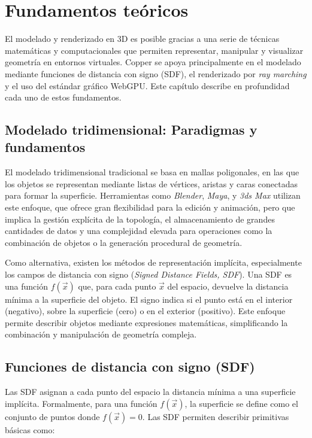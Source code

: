 \chapter{Fundamentos teóricos}

El modelado y renderizado en 3D es posible gracias a una serie de técnicas
matemáticas y computacionales que permiten representar, manipular y visualizar
geometría en entornos virtuales. Copper se apoya principalmente en el modelado
mediante funciones de distancia con signo (SDF), el renderizado por \textit{ray
    marching} y el uso del estándar gráfico WebGPU. Este capítulo describe en
profundidad cada uno de estos fundamentos.

\section{Modelado tridimensional: Paradigmas y fundamentos}

El modelado tridimensional tradicional se basa en mallas poligonales, en las
que los objetos se representan mediante listas de vértices, aristas y caras
conectadas para formar la superficie. Herramientas como \textit{Blender},
\textit{Maya}, y \textit{3ds Max} utilizan este enfoque, que ofrece gran
flexibilidad para la edición y animación, pero que implica la gestión explícita
de la topología, el almacenamiento de grandes cantidades de datos y una
complejidad elevada para operaciones como la combinación de objetos o la
generación procedural de
geometría.

Como alternativa, existen los métodos de representación implícita,
especialmente los campos de distancia con signo (\textit{Signed Distance
    Fields, SDF}). Una SDF es una función $f(\vec{x})$ que, para cada punto
$\vec{x}$ del espacio, devuelve la distancia mínima a la superficie del objeto.
El signo indica si el punto está en el interior (negativo), sobre la superficie
(cero) o en el exterior (positivo). Este enfoque permite describir objetos
mediante expresiones matemáticas, simplificando la combinación y manipulación
de geometría compleja.

\section{Funciones de distancia con signo (SDF)}

Las SDF asignan a cada punto del espacio la distancia mínima a una superficie
implícita. Formalmente, para una función $f(\vec{x})$, la superficie se define
como el conjunto de puntos donde $f(\vec{x}) = 0$. Las SDF permiten describir
primitivas básicas como:

